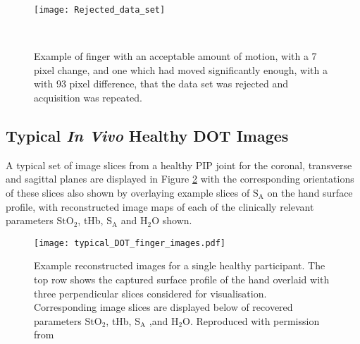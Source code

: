\documentclass[twoside]{bhamthesis}
\theoremstyle{definition}
\begin{document}
\begin{figure}[!ht]
\texttt{[image: Rejected\_data\_set]}
\centering
\caption{Example of finger with an acceptable amount of motion, with a 7 pixel change, and one which had moved significantly enough, with a with 93 pixel difference, that the data set was rejected and acquisition was repeated.}
  \label{fig:Rejected_data_set}\
\end{figure}

\subsection{Typical \textit{In Vivo} Healthy DOT Images}
\label{Typical Healthy}

A typical set of image slices from a healthy PIP joint for the coronal, transverse and sagittal planes are displayed in Figure \ref{Typical healthy} with the corresponding orientations of these slices also shown by overlaying example slices of $\mathrm{S_A}$ on the hand surface profile, with reconstructed image maps of each of the clinically relevant parameters $\mathrm{StO_2}$, tHb, $\mathrm{S_A}$ and $\mathrm{H_2O}$ shown.

\begin{figure}[!ht]
\centering\texttt{[image: typical\_DOT\_finger\_images.pdf]}
\caption{Example reconstructed images for a single healthy participant. The top row shows the captured surface profile of the hand overlaid with three perpendicular slices considered for visualisation. Corresponding image slices are displayed below of recovered parameters $\mathrm{StO_2}$, tHb, $\mathrm{S_A}$ ,and $\mathrm{H_2O}$. Reproduced with permission from \cite{lighter2018multispectral}}
\label{Typical healthy}
\end{figure}
\end{document}
